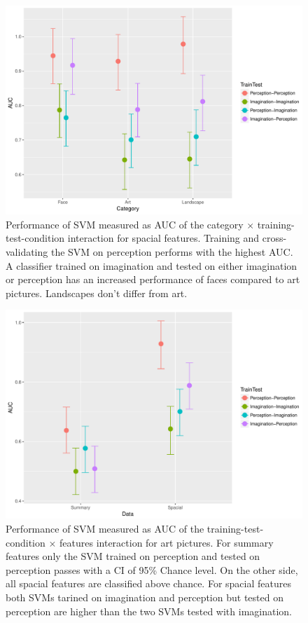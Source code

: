 \documentclass[a4paper,man,natbib,floatsintext]{apa6}
\begin{document}
\begin{figure}
\centering
\includegraphics[width=1\textwidth]{CategoryXTrainTest.pdf}
\caption[Category $\times$ Training-Test-Condition]{\label{fig:CategoryXTrainTest} Performance of SVM measured as AUC of the category $\times$ training-test-condition interaction for spacial features. Training and cross-validating the SVM on perception performs with the highest AUC.    A classifier trained on imagination and tested on either imagination or perception has an increased performance of faces compared to art pictures. Landscapes don't differ from art.}
\end{figure}
\begin{figure}
\centering
\includegraphics[width=1\textwidth]{FeatureXTrainTest.pdf}
\caption[Training-Test-Condition $\times$ Features]{\label{fig:FeatureXTrainTest} Performance of SVM measured as AUC of the training-test-condition $\times$ features interaction for art pictures. For summary features only the SVM trained on perception and tested on perception passes with a CI of 95\% Chance level. On the other side, all spacial features are classified above chance. For spacial features both SVMs tarined on imagination and perception but tested on perception are higher than the two SVMs tested with imagination. } 
\end{figure}
\end{document}

